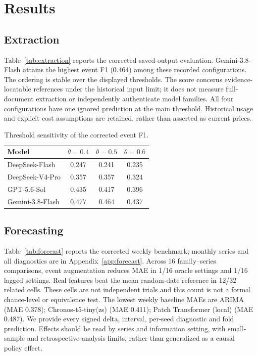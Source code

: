 \documentclass[sigconf,anonymous,review]{acmart}
\begin{document}
\section{Results}

\subsection{Extraction}
Table~\ref{tab:extraction} reports the corrected saved-output evaluation. Gemini-3.8-Flash attains the highest event F1 (0.464) among these recorded configurations. The ordering is stable over the displayed thresholds. The score concerns evidence-locatable references under the historical input limit; it does not measure full-document extraction or independently authenticate model families. All four configurations have one ignored prediction at the main threshold. Historical usage and explicit cost assumptions are retained, rather than asserted as current prices.



\begin{table}[t]
\centering\small
\caption{Threshold sensitivity of the corrected event F1.}
\label{tab:threshold}
\begin{tabular}{lccc}\toprule
Model & $\theta=0.4$ & $\theta=0.5$ & $\theta=0.6$\\\midrule
    DeepSeek-Flash & 0.247 & 0.241 & 0.235 \\
    DeepSeek-V4-Pro & 0.357 & 0.357 & 0.324 \\
    GPT-5.6-Sol & 0.435 & 0.417 & 0.396 \\
    Gemini-3.8-Flash & 0.477 & 0.464 & 0.437 \\
\bottomrule\end{tabular}\end{table}

\subsection{Forecasting}
Table~\ref{tab:forecast} reports the corrected weekly benchmark; monthly series and all diagnostics are in Appendix~\ref{app:forecast}. Across 16 family--series comparisons, event augmentation reduces MAE in 1/16 oracle settings and 1/16 lagged settings. Real features beat the mean random-date reference in 12/32 related cells. These cells are not independent trials and this count is not a formal chance-level or equivalence test. The lowest weekly baseline MAEs are ARIMA (MAE 0.378); Chronos-t5-tiny(zs) (MAE 0.411); Patch Transformer (local) (MAE 0.487). We provide every signed delta, interval, per-seed diagnostic and fold prediction. Effects should be read by series and information setting, with small-sample and retrospective-analysis limits, rather than generalized as a causal policy effect.
\end{document}
